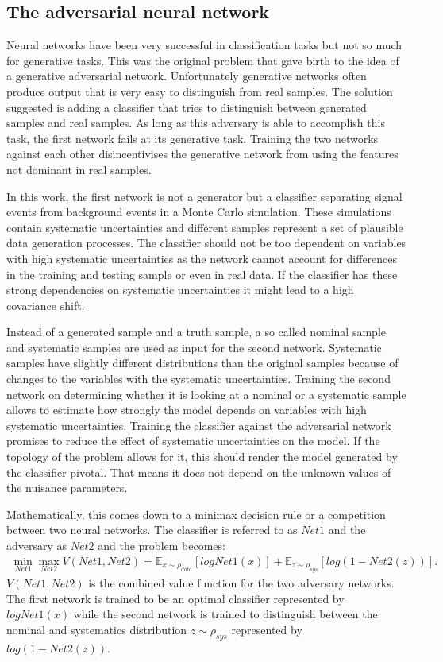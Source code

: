 \subsection{The adversarial neural network}

Neural networks have been very successful in classification tasks but not so much for generative tasks. This was the original problem that gave birth to the idea of a generative adversarial network. Unfortunately generative networks often produce output that is very easy to distinguish from real samples. The solution suggested is adding a classifier that tries to distinguish between generated samples and real samples. As long as this adversary is able to accomplish this task, the first network fails at its generative task. Training the two networks against each other disincentivises the generative network from using the features not dominant in real samples.

In this work, the first network is not a generator but a classifier separating signal events from background events in a Monte Carlo simulation. These simulations contain systematic uncertainties and different samples represent a set of plausible data generation processes. The classifier should not be too dependent on variables with high systematic uncertainties as the network cannot account for differences in the training and testing sample or even in real data. If the classifier has these strong dependencies on systematic uncertainties it might lead to a high covariance shift.

Instead of a generated sample and a truth sample, a so called nominal sample and systematic samples are used as input for the second network. Systematic samples have slightly different distributions than the original samples because of changes to the variables with the systematic uncertainties. Training the second network on determining whether it is looking at a nominal or a systematic sample allows to estimate how strongly the model depends on variables with high systematic uncertainties. Training the classifier against the adversarial network promises to reduce the effect of systematic uncertainties on the model. If the topology of the problem allows for it, this should render the model generated by the classifier pivotal. That means it does not depend on the unknown values of the nuisance parameters.

Mathematically, this comes down to a minimax decision rule or a competition between two neural networks. The classifier is referred to as $Net1$ and the adversary as $Net2$ and the problem becomes:
%
\begin{align}
    \min_{Net1} \max_{Net2} V(Net1, Net2) = \mathbb{E}_{\mathit{x} \sim \rho_{data}} [ log Net1(\mathit{x}) ] + \mathbb{E}_{\mathit{z} \sim \rho_{sys}} [ log (1 - Net2(\mathit{z}) ) ].
\end{align}
%
$V(Net1, Net2)$ is the combined value function for the two adversary networks. The first network is trained to be an optimal classifier represented by $log Net1(\mathit{x})$ while the second network is trained to distinguish between the nominal and systematics distribution $\mathit{z} \sim \rho_{sys}$ represented by $log (1 - Net2(\mathit{z}))$.

